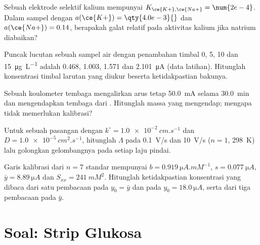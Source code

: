 \begin{exercise}[$\star\star$]\label{exo:b3:electrode-kinetics:8}
Sebuah elektrode selektif kalium mempunyai $K_{\ce{K+},\ce{Na+}} = \num{2e-4}$. Dalam
sampel dengan $a(\ce{K+}) =
\qty{4.0e-3}{}$ dan $a(\ce{Na+}) = 0.14$, berapakah galat relatif pada aktivitas
kalium jika natrium diabaikan?
\end{exercise}

\begin{exercise}[$\star\star$]\label{exo:b3:electrode-kinetics:9}
Puncak lucutan sebuah sampel air dengan penambahan timbal 0, 5, 10 dan
\qty{15}{\micro g.L^{-1}} adalah 0.468, 1.003, 1.571 dan \qty{2.101}{\micro A}
(data latihan). Hitunglah konsentrasi timbal larutan yang diukur beserta
ketidakpastian bakunya.
\end{exercise}

\begin{exercise}[$\star\star\star$]\label{exo:b3:electrode-kinetics:10}
Sebuah koulometer tembaga mengalirkan arus tetap \qty{50.0}{mA} selama
\qty{30.0}{min} dan mengendapkan tembaga dari . Hitunglah massa
yang mengendap; mengapa  tidak memerlukan kalibrasi?
\end{exercise}

\begin{exercise}[$\star\star\star$]\label{exo:b3:electrode-kinetics:11}
Untuk sebuah pasangan dengan $k^\circ = \qty{1.0e-2}{cm.s^{-1}}$ dan
$D = \qty{1.0e-5}{cm^2.s^{-1}}$, hitunglah $\Lambda$ pada \qty{0.1}{V/s} dan
\qty{10}{V/s} ($n = 1$, \qty{298}{K}) lalu golongkan gelombangnya pada setiap
laju pindai.
\end{exercise}

\begin{exercise}[$\star\star\star$]\label{exo:b3:electrode-kinetics:12}
Garis kalibrasi dari $n = 7$ standar mempunyai $b = \qty{0.919}{\micro A.mM^{-1}}$,
$s = \qty{0.077}{\micro A}$, $\bar y = \qty{8.89}{\micro A}$ dan
$S_{xx} = \qty{241}{mM^2}$. Hitunglah ketidakpastian konsentrasi yang dibaca dari
satu pembacaan pada $y_0 = \bar y$ dan pada $y_0 = \qty{18.0}{\micro A}$, serta
dari tiga pembacaan pada $\bar y$.
\end{exercise}

\section{Soal: Strip Glukosa}

